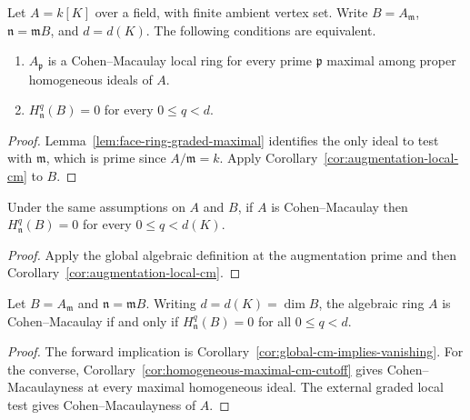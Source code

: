 \begin{corollary}\label{cor:homogeneous-maximal-cm-cutoff}
Let $A=k[K]$ over a field, with finite ambient vertex set. Write
$B=A_{\mathfrak m}$, $\mathfrak n=\mathfrak m B$, and $d=d(K)$.
The following conditions are equivalent.
\begin{enumerate}
\item $A_{\mathfrak p}$ is a Cohen--Macaulay local ring for every
prime $\mathfrak p$ maximal among proper homogeneous ideals of $A$.
\item $H^q_{\mathfrak n}(B)=0$ for every $0\le q<d$.
\end{enumerate}
\leanok
\end{corollary}
\begin{proof}
\leanok
Lemma~\ref{lem:face-ring-graded-maximal} identifies the only ideal to
test with $\mathfrak m$, which is prime since $A/\mathfrak m=k$.
Apply Corollary~\ref{cor:augmentation-local-cm} to $B$.
\end{proof}

\begin{corollary}\label{cor:global-cm-implies-vanishing}
Under the same assumptions on $A$ and $B$, if $A$ is Cohen--Macaulay
then $H^q_{\mathfrak n}(B)=0$ for every $0\le q<d(K)$.
\leanok
\end{corollary}
\begin{proof}
\leanok
Apply the global algebraic definition at the augmentation prime
and then Corollary~\ref{cor:augmentation-local-cm}.
\end{proof}

\begin{corollary}\label{cor:cm-lc}
Let $B=A_{\mathfrak m}$ and $\mathfrak n=\mathfrak mB$. Writing
$d=d(K)=\dim B$, the algebraic ring $A$ is Cohen--Macaulay if and only if
$H^q_{\mathfrak n}(B)=0$ for all $0\le q<d$.
\end{corollary}
\begin{proof}
The forward implication is Corollary~\ref{cor:global-cm-implies-vanishing}.
For the converse, Corollary~\ref{cor:homogeneous-maximal-cm-cutoff} gives
Cohen--Macaulayness at every maximal homogeneous ideal. The external
graded local test gives Cohen--Macaulayness of $A$.
\end{proof}

